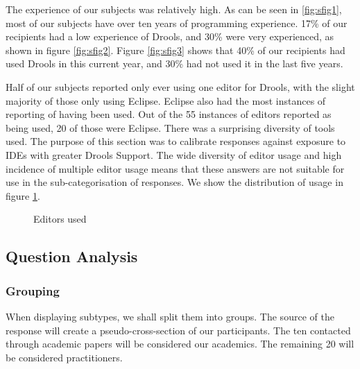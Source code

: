 The experience of our subjects was relatively high.
As can be seen in \ref{fig:sfig1}, most of our subjects have over ten years of programming experience.
17\% of our recipients had a low experience of Drools, and 30\% were very experienced, as shown in figure \ref{fig:sfig2}.
Figure \ref{fig:sfig3} shows that 40\% of our recipients had used Drools in this current year, and 30\% had not used it in the last five years.

Half of our subjects reported only ever using one editor for Drools, with the slight majority of those only using Eclipse.
Eclipse also had the most instances of reporting of having been used.
Out of the 55 instances of editors reported as being used, 20 of those were Eclipse.
There was a surprising diversity of tools used.
The purpose of this section was to calibrate responses against exposure to IDEs with greater Drools Support.
The wide diversity of editor usage and high incidence of multiple editor usage means that these answers are not suitable for use in the sub-categorisation of responses. 
We show the distribution of usage in figure \ref{fig:editorUsage}.

\begin{figure}[h]
    \centering
    \caption{Editors used}
    \label{fig:editorUsage}
\end{figure}

\subsection{Question Analysis}

\subsubsection{Grouping}
When displaying subtypes, we shall split them into groups.
The source of the response will create a pseudo-cross-section of our participants.
The ten contacted through academic papers will be considered our academics.
The remaining 20 will be considered practitioners.

